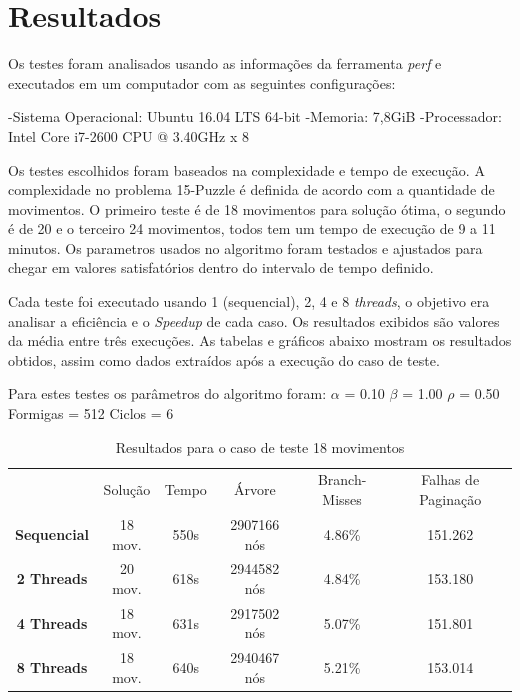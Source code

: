\documentclass[12pt]{article}
\begin{document}
\section{Resultados}\label{sec:resultados}
Os testes foram analisados usando as informações da ferramenta \textit{perf} e executados em um computador com as seguintes configurações: 

\noindent -Sistema Operacional: Ubuntu 16.04 LTS 64-bit\newline
-Memoria: 7,8GiB\newline
-Processador: Intel Core i7-2600 CPU @ 3.40GHz x 8\newline

Os testes escolhidos foram baseados na complexidade e tempo de execução. A complexidade no problema 15-Puzzle é definida de acordo com a quantidade de movimentos. O primeiro teste é de 18 movimentos para solução ótima, o segundo é de 20 e o terceiro 24 movimentos, todos tem um tempo de execução de 9 a 11 minutos. Os parametros usados no algoritmo foram testados e ajustados para chegar em valores satisfatórios dentro do intervalo de tempo definido.

Cada teste foi executado usando 1 (sequencial), 2, 4 e 8 \textit{threads}, o objetivo era analisar a eficiência e o \textit{Speedup} de cada caso. Os resultados exibidos são valores da média entre três execuções. As tabelas e gráficos abaixo mostram os resultados obtidos, assim como dados extraídos após a execução do caso de teste.

\noindent Para estes testes os parâmetros do algoritmo foram:
\newline
$\alpha$ = 0.10\newline
$\beta$ = 1.00\newline
$\rho$ = 0.50\newline
Formigas = 512\newline
Ciclos = 6

\begin{table}[!ht]
\centering
\caption{Resultados para o caso de teste 18 movimentos}
\label{tabela1}
\begin{tabular}{cccccc}
                    & Solução & Tempo & Árvore & Branch-Misses & Falhas de Paginação \\
\textbf{Sequencial} & 18 mov.          & 550s           & 2907166 nós     & 4.86\%                 & 151.262                      \\
\textbf{2 Threads}  & 20 mov.          & 618s           & 2944582 nós     & 4.84\%                 & 153.180                      \\
\textbf{4 Threads}  & 18 mov.          & 631s           & 2917502 nós     & 5.07\%                 & 151.801                      \\
\textbf{8 Threads}  & 18 mov.          & 640s           & 2940467 nós     & 5.21\%                 & 153.014                     
\end{tabular}
\end{table}
\end{document}
